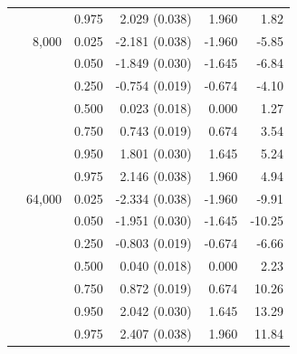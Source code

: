 \begin{tabular}{rrrrrr}
 &  & 0.975 & 2.029 (0.038) & 1.960 & 1.82 \\
\addlinespace
4 & 8,000 & 0.025 & -2.181 (0.038) & -1.960 & -5.85 \\
 &  & 0.050 & -1.849 (0.030) & -1.645 & -6.84 \\
 &  & 0.250 & -0.754 (0.019) & -0.674 & -4.10 \\
 &  & 0.500 & 0.023 (0.018) & 0.000 & 1.27 \\
 &  & 0.750 & 0.743 (0.019) & 0.674 & 3.54 \\
 &  & 0.950 & 1.801 (0.030) & 1.645 & 5.24 \\
 &  & 0.975 & 2.146 (0.038) & 1.960 & 4.94 \\
\addlinespace
4 & 64,000 & 0.025 & -2.334 (0.038) & -1.960 & -9.91 \\
 &  & 0.050 & -1.951 (0.030) & -1.645 & -10.25 \\
 &  & 0.250 & -0.803 (0.019) & -0.674 & -6.66 \\
 &  & 0.500 & 0.040 (0.018) & 0.000 & 2.23 \\
 &  & 0.750 & 0.872 (0.019) & 0.674 & 10.26 \\
 &  & 0.950 & 2.042 (0.030) & 1.645 & 13.29 \\
 &  & 0.975 & 2.407 (0.038) & 1.960 & 11.84 \\
\bottomrule
\end{tabular}
